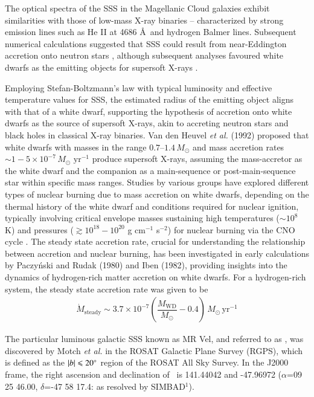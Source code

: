     The optical spectra of the SSS in the Magellanic Cloud galaxies exhibit similarities with those of low-mass X-ray binaries -- characterized by strong emission lines such as He II at 4686 \AA\ and hydrogen Balmer lines. Subsequent numerical calculations suggested that SSS could result from near-Eddington accretion onto neutron stars \cite{kylafis93}, although subsequent analyses favoured white dwarfs as the emitting objects for supersoft X-rays \cite{vandenHeuvel92}.
    
    Employing Stefan-Boltzmann's law with typical luminosity and effective temperature values for SSS, the estimated radius of the emitting object aligns with that of a white dwarf, supporting the hypothesis of accretion onto white dwarfs as the source of supersoft X-rays, akin to accreting neutron stars and black holes in classical X-ray binaries. Van den Heuvel \textit{et al.} (1992) proposed that white dwarfs with masses in the range $0.7–1.4\,M_\odot$ and mass accretion rates $\sim 1-5\times 10^{-7}\,M_\odot\text{ yr}^{-1}$ produce supersoft X-rays, assuming the mass-accretor as the white dwarf and the companion as a main-sequence or post-main-sequence star within specific mass ranges. %
    Studies by various groups have explored different types of nuclear burning due to mass accretion on white dwarfs, depending on the thermal history of the white dwarf and conditions required for nuclear ignition, typically involving critical envelope masses %
    sustaining high temperatures ($\sim 10^8$ K) and pressures ($\gtrsim 10^{18}-10^{20}$ g cm$^{-1}$ s$^{-2}$) for nuclear burning via the CNO cycle \cite{paczynski78,prialnik78,sion79,sienkiewicz80,nomoto82,fujimoto82a,fujimoto82b,iben82,prialnik95,macdonald83}. The steady state accretion rate, crucial for understanding the relationship between accretion and nuclear burning, has been investigated in early calculations by Paczy\'{n}ski and Rudak (1980) \cite{paczynski80} and Iben (1982), providing insights into the dynamics of hydrogen-rich matter accretion on white dwarfs. For a hydrogen-rich system, the steady state accretion rate was given to be \cite{hachisu2001}
	\begin{align}
		\dot{M}_\text{steady}\sim 3.7\times 10^{-7}\left( \dfrac{M_\text{WD}}{M_\odot}-0.4 \right)\,M_\odot\,\text{yr}^{-1} \label{eqn:steady-mass-accr}
	\end{align}
	
	The particular luminous galactic SSS known as MR Vel, and referred to as \source, was discovered by Motch \textit{et al.} \cite{motch1994} in the ROSAT Galactic Plane Survey (RGPS), which  is defined as the $|b|\leqslant 20\degree$ region of the ROSAT All Sky Survey. In the J2000 frame, the right ascension and declination of \source\ is 141.44042 and -47.96972 ($\alpha$=09 25 46.00, $\delta$=-47 58 17.4: as resolved by SIMBAD$^1$).
	
